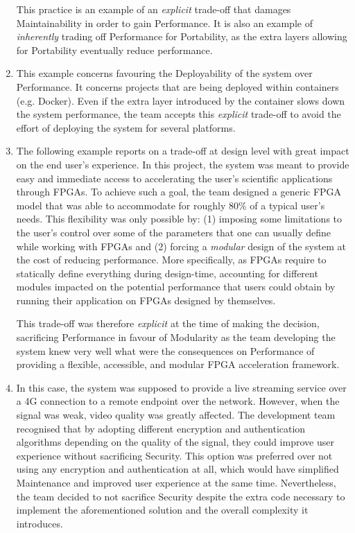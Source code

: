 \begin{enumerate}
    This practice is an example of an \textit{explicit} trade-off that damages Maintainability in order to gain Performance. 
    It is also an example of \textit{inherently} trading off  Performance for Portability, as the extra layers allowing for Portability eventually reduce performance.

    \item This example concerns favouring the Deployability of the system over Performance.
    It concerns projects that are being deployed within containers (e.g. Docker). Even if the extra layer introduced by the container slows down the system performance, the team accepts this \textit{explicit} trade-off to avoid the effort of deploying the system for several platforms.
    
    \item The following example reports on a trade-off at design level with great impact on the end user's experience.
    In this project, the system was meant to provide easy and immediate access to accelerating the user's scientific applications through FPGAs.
    To achieve such a goal, the team designed a generic FPGA model that was able to accommodate for roughly 80\% of a typical user's needs. 
    This flexibility was only possible by: (1) imposing some limitations to the user's control over some of the parameters that one can usually define while working with FPGAs and (2) forcing a \textit{modular} design of the system at the cost of reducing performance.
    More specifically, as FPGAs require to statically define everything during design-time, accounting for different modules impacted on the potential performance that users could obtain by running their application on FPGAs designed by themselves.
    
    This trade-off was therefore \textit{explicit} at the time of making the decision, sacrificing Performance in favour of Modularity as the team developing the system knew very well what were the consequences on Performance of providing a flexible, accessible, and modular FPGA acceleration framework.
    
    \item In this case, the system was supposed to provide a live streaming service over a 4G connection to a remote endpoint over the network.
    However, when the signal was weak, video quality was greatly affected. The development team recognised that by adopting different encryption and authentication algorithms depending on the quality of the signal, they could improve user experience without sacrificing Security.
    This option was preferred over not using any encryption and authentication at all, which would have simplified Maintenance and improved user experience at the same time.
    Nevertheless, the team decided to not sacrifice Security despite the extra code necessary to implement the aforementioned solution and the overall complexity it introduces.
    

\end{enumerate}
